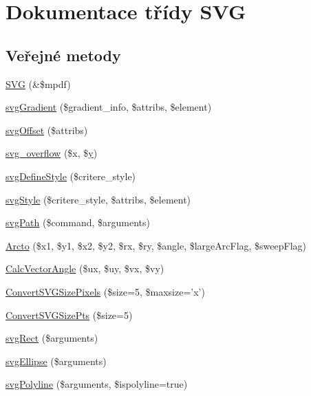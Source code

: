 \hypertarget{class_s_v_g}{\section{Dokumentace třídy S\-V\-G}
\label{class_s_v_g}
}
\subsection*{Veřejné metody}
\begin{DoxyCompactItemize}
\item 
\hyperlink{class_s_v_g_a67943cc0421f4c662c1e9cdbdcf9719a}{S\-V\-G} (\&\$mpdf)
\item 
\hyperlink{class_s_v_g_a7fde77ba89bc69d81a4d1e963176648e}{svg\-Gradient} (\$gradient\-\_\-info, \$attribs, \$element)
\item 
\hyperlink{class_s_v_g_a6c56c52f2c0a1493c63365dc83da07af}{svg\-Offset} (\$attribs)
\item 
\hyperlink{class_s_v_g_aa8d5e96ef2ae8bbe905b75a4ca98adb6}{svg\-\_\-overflow} (\$x, \$\hyperlink{example43___m_p_d_f_i__booklet_8php_a3f83be162d14f38451e1bc419fbbbcbc}{y})
\item 
\hyperlink{class_s_v_g_aa47812602c8bed32b632fd59a33b8aa2}{svg\-Define\-Style} (\$critere\-\_\-style)
\item 
\hyperlink{class_s_v_g_a7f039c955ee8222dd35ce2675ae8103a}{svg\-Style} (\$critere\-\_\-style, \$attribs, \$element)
\item 
\hyperlink{class_s_v_g_af704f195e967e6c786a4aa48c3bea544}{svg\-Path} (\$command, \$arguments)
\item 
\hyperlink{class_s_v_g_adcb3bfc469f15e00593156e93ffb32f8}{Arcto} (\$x1, \$y1, \$x2, \$y2, \$rx, \$ry, \$angle, \$large\-Arc\-Flag, \$sweep\-Flag)
\item 
\hyperlink{class_s_v_g_a1e415977f6b8eb4141816656a7415ecd}{Calc\-Vector\-Angle} (\$ux, \$uy, \$vx, \$vy)
\item 
\hyperlink{class_s_v_g_a816ef43c8f7fa7d0de7954dc50a3aa21}{Convert\-S\-V\-G\-Size\-Pixels} (\$size=5, \$maxsize='x')
\item 
\hyperlink{class_s_v_g_aa042f09767cae0f1f89d91cff800d406}{Convert\-S\-V\-G\-Size\-Pts} (\$size=5)
\item 
\hyperlink{class_s_v_g_a1f4682e3dfa05e89e51867b7c718b4d5}{svg\-Rect} (\$arguments)
\item 
\hyperlink{class_s_v_g_acd9cda357df02770b8a0b6d66db3fb46}{svg\-Ellipse} (\$arguments)
\item 
\hyperlink{class_s_v_g_ac95ad552e2c2fd2168987e094e5625d3}{svg\-Polyline} (\$arguments, \$ispolyline=true)

\end{DoxyCompactItemize}
